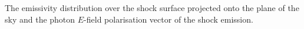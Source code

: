 The emissivity distribution over the shock surface projected onto the plane of the sky and the photon $E$-field polarisation vector of the shock emission.